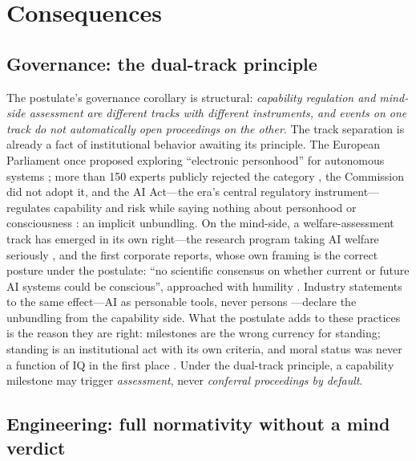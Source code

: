 \documentclass[10pt]{article}
\begin{document}
\section{Consequences}\label{sec:consequences}

\subsection{Governance: the dual-track principle}\label{sec:governance}

The postulate's governance corollary is structural: \emph{capability regulation and mind-side assessment are different tracks with different instruments, and events on one track do not automatically open proceedings on the other}. The track separation is already a fact of institutional behavior awaiting its principle. The European Parliament once proposed exploring ``electronic personhood'' for autonomous systems \cite{eu2017resolution}; more than 150 experts publicly rejected the category \cite{eu2018letter}, the Commission did not adopt it, and the AI Act---the era's central regulatory instrument---regulates capability and risk while saying nothing about personhood or consciousness \cite{euaiact2024}: an implicit unbundling. On the mind-side, a welfare-assessment track has emerged in its own right---the research program taking AI welfare seriously \cite{long2024welfare}, and the first corporate reports, whose own framing is the correct posture under the postulate: ``no scientific consensus on whether current or future AI systems could be conscious'', approached with humility \cite{anthropic2025welfare}. Industry statements to the same effect---AI as personable tools, never persons \cite{suleyman2026personable}---declare the unbundling from the capability side. What the postulate adds to these practices is the reason they are right: milestones are the wrong currency for standing; standing is an institutional act with its own criteria, and moral status was never a function of IQ in the first place \cite{bostrom2014ethics,gunkel2018rights}. Under the dual-track principle, a capability milestone may trigger \emph{assessment}, never \emph{conferral proceedings by default}.

\subsection{Engineering: full normativity without a mind verdict}\label{sec:engineering}
\end{document}

